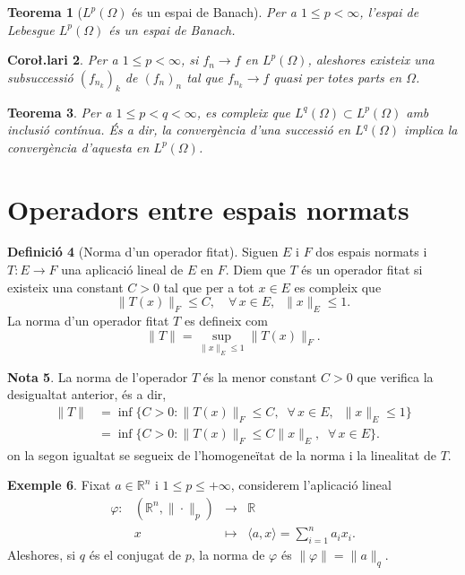 \documentclass[12pt]{book}
\newtheorem{teorema}{Teorema}[chapter]
\newtheorem{coro}[teorema]{Coro\l.lari}
\theoremstyle{definition}
\newtheorem{defi}[teorema]{Definició}
\theoremstyle{nota}
\newtheorem{nota}[teorema]{Nota}
\theoremstyle{exemple}
\newtheorem{exemple}[teorema]{Exemple}
\begin{document}
\begin{teorema}[$L^p(\Omega)$ és un espai de Banach]
  Per a $1 \leq p < \infty$, l'espai de Lebesgue $L^p(\Omega)$ és un
  espai de Banach.
\end{teorema}

\begin{coro}
  Per a $1 \leq p < \infty$, si $f_n \to f$ en $L^p(\Omega)$,
  aleshores existeix una subsuccessió $(f_{n_k})_k$ de $(f_n)_n$ tal
  que $f_{n_k} \to f$ quasi per totes parts en $\Omega$.
\end{coro}

\begin{teorema}
  Per a $1 \leq p < q < \infty$, es compleix que
  $L^q(\Omega) \subset L^p(\Omega)$ amb inclusió contínua. És a dir,
  la convergència d'una successió en $L^q(\Omega)$ implica la
  convergència d'aquesta en $L^p(\Omega)$.
\end{teorema}

\section{Operadors entre espais normats}

\begin{defi}[Norma d'un operador fitat]
  Siguen $E$ i $F$ dos espais normats i $T : E \to F$ una aplicació
  lineal de $E$ en $F$. Diem que $T$ és un operador fitat si existeix
  una constant $C > 0$ tal que per a tot $x \in E$ es compleix que
  \[
    \|T(x)\|_F \leq C, \quad \forall\, x \in E, \;\; \|x\|_E \leq 1.
  \]
  La norma d'un operador fitat $T$ es defineix com
  \[
    \|T\| = \sup_{\|x\|_E \leq 1} \|T(x)\|_F.
  \]
\end{defi}

\begin{nota}
  La norma de l'operador $T$ és la menor constant $C > 0$ que verifica
  la desigualtat anterior, és a dir,
  \begin{align*}
    \|T\| &= \inf\{C > 0 : \|T(x)\|_F \leq C, \;\; \forall\, x \in E, \;\; \|x\|_E \leq 1\} \\
          &= \inf\{C > 0 : \|T(x)\|_F \leq C \|x\|_E, \;\; \forall\, x \in E\}.
  \end{align*}
  on la segon igualtat se segueix de l'homogeneïtat de la norma i la
  linealitat de $T$.
\end{nota}

\begin{exemple}
  Fixat $a \in \mathbb{R}^n$ i $1 \leq p \leq +\infty$, considerem
  l'aplicació lineal
  \begin{equation*}
    \begin{array}{lrcl}
      \varphi : & (\mathbb{R}^n, \|\cdot\|_p) &\longrightarrow& \mathbb{R} \\
      & x &\longmapsto& \langle a, x \rangle = \sum\limits_{i=1}^{n}a_ix_i.
    \end{array}
  \end{equation*}
  Aleshores, si $q$ és el conjugat de $p$, la norma de $\varphi$ és
  $\|\varphi\| = \|a\|_q$.
\end{exemple}
\end{document}
